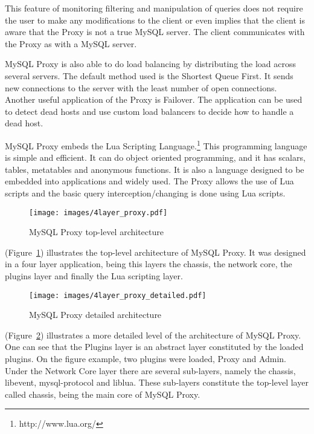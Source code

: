 This feature of monitoring filtering and manipulation of queries does not require the user to make any modifications to the client or even implies that the client is aware that the Proxy is not a true MySQL server. The client communicates with the Proxy as with a MySQL server.

MySQL Proxy is also able to do load balancing by distributing the load across several servers. The default method used is the Shortest Queue First. It sends new connections to the server with the least number of open connections.
Another useful application of the Proxy is Failover. The application can be used to detect dead hosts and use custom load balancers to decide how to handle a dead host.


MySQL Proxy embeds the Lua Scripting Language.\footnote{http://www.lua.org/} This programming language is simple and efficient. It can do object oriented programming, and it has scalars, tables, metatables and anonymous functions. It is also a language designed to be embedded into applications and widely used. The Proxy allows the use of Lua scripts and the basic query interception/changing is done using Lua scripts.

\begin{figure}[t]
\centering    
\texttt{[image: images/4layer\_proxy.pdf]}
\caption{MySQL Proxy top-level architecture}
\label{fig:4layer_proxy}
\end{figure}


(Figure~\ref{fig:4layer_proxy}) illustrates the top-level architecture of MySQL Proxy. It was designed in a four layer application, being this layers the chassis, the network core, the plugins layer and finally the Lua scripting layer.

\begin{figure}[t]
\centering    
\texttt{[image: images/4layer\_proxy\_detailed.pdf]}
\caption{MySQL Proxy detailed architecture}
\label{fig:4layer_proxy_detailed}
\end{figure}

(Figure~\ref{fig:4layer_proxy_detailed}) illustrates a more detailed level of the architecture of MySQL Proxy. One can see that the Plugins layer is an abstract layer constituted by the loaded plugins. On the figure example, two plugins were loaded, Proxy and Admin. Under the Network Core layer there are several sub-layers, namely the chassis, libevent, mysql-protocol and liblua. These sub-layers constitute the top-level layer called chassis, being the main core of MySQL Proxy.

